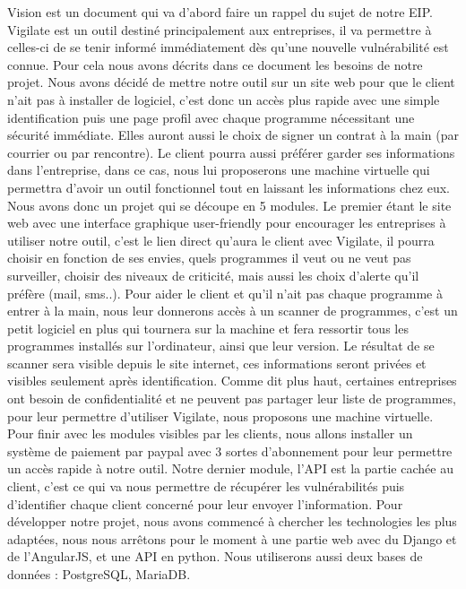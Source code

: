 Vision est un document qui va d'abord faire un rappel du sujet de notre EIP. Vigilate est un outil destiné principalement aux entreprises, il va permettre à celles-ci de se tenir informé immédiatement dès qu'une nouvelle vulnérabilité est connue. Pour cela nous avons décrits dans ce document les besoins de notre projet. Nous avons décidé de mettre notre outil sur un site web pour que le client n'ait pas à installer de logiciel, c'est donc un accès plus rapide avec une simple identification puis une page profil avec chaque programme nécessitant une sécurité immédiate. Elles auront aussi le choix de signer un contrat à la main (par courrier ou par rencontre). Le client pourra aussi préférer garder ses informations dans l'entreprise, dans ce cas, nous lui proposerons une machine virtuelle qui permettra d'avoir un outil fonctionnel tout en laissant les informations chez eux. Nous avons donc un projet qui se découpe en 5 modules. Le premier étant le site web avec une interface graphique user-friendly pour encourager les entreprises à utiliser notre outil, c'est le lien direct qu'aura le client avec Vigilate, il pourra choisir en fonction de ses envies, quels programmes il veut ou ne veut pas surveiller, choisir des niveaux de criticité, mais aussi les choix d'alerte qu'il préfère (mail, sms..). Pour aider le client et qu'il n'ait pas chaque programme à entrer à la main, nous leur donnerons accès à un scanner de programmes, c'est un petit logiciel en plus qui tournera sur la machine et fera ressortir tous les programmes installés sur l'ordinateur, ainsi que leur version. Le résultat de se scanner sera visible depuis le site internet, ces informations seront privées et visibles seulement après identification. Comme dit plus haut, certaines entreprises ont besoin de confidentialité et ne peuvent pas partager leur liste de programmes, pour leur permettre d'utiliser Vigilate, nous proposons une machine virtuelle. Pour finir avec les modules visibles par les clients, nous allons installer un système de paiement par paypal avec 3 sortes d'abonnement pour leur permettre un accès rapide à notre outil. Notre dernier module, l'API est la partie cachée au client, c'est ce qui va nous permettre de récupérer les vulnérabilités puis d'identifier chaque client concerné pour leur envoyer l'information. Pour développer notre projet, nous avons commencé à chercher les technologies les plus adaptées, nous nous arrêtons pour le moment à une partie web avec du Django et de l'AngularJS, et une API en python. Nous utiliserons aussi deux bases de données : PostgreSQL, MariaDB.